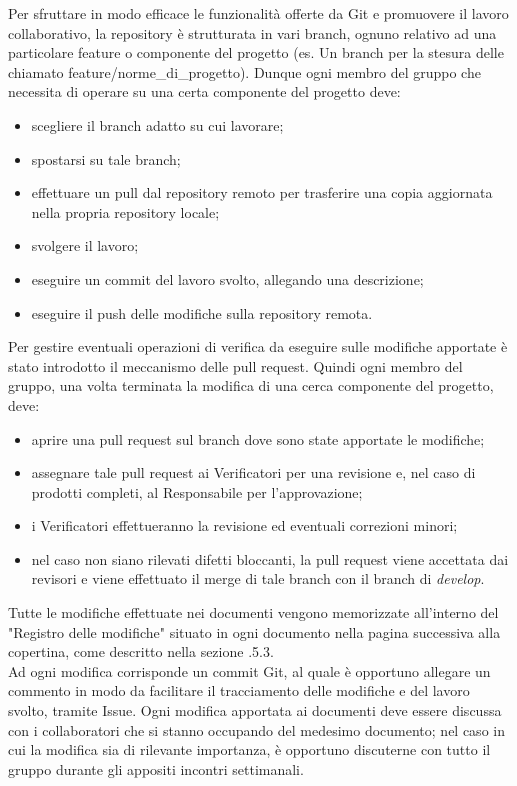         Per sfruttare in modo efficace le funzionalità offerte da Git e promuovere il lavoro collaborativo, la repository è strutturata in vari branch, ognuno relativo ad una particolare feature o componente del progetto (es. Un branch per la stesura delle \NdP{} chiamato feature/norme\_di\_progetto). Dunque ogni membro del gruppo che necessita di operare su una certa componente del progetto deve:
        \begin{itemize}
          \item scegliere il branch adatto su cui lavorare;
          \item spostarsi su tale branch;
          \item effettuare un pull dal repository remoto per trasferire una copia aggiornata nella propria repository locale;
          \item svolgere il lavoro;
          \item eseguire un commit del lavoro svolto, allegando una descrizione;
          \item eseguire il push delle modifiche sulla repository remota.
        \end{itemize}
    	Per gestire eventuali operazioni di verifica da eseguire sulle modifiche apportate è stato introdotto il meccanismo delle pull request. Quindi ogni membro del gruppo, una volta terminata la modifica di una cerca componente del progetto, deve:
    	\begin{itemize}
    		\item aprire una pull request sul branch dove sono state apportate le modifiche;
    		\item assegnare tale pull request ai Verificatori per una revisione e, nel caso di prodotti completi, al Responsabile per l'approvazione;
    		\item i Verificatori effettueranno la revisione ed eventuali correzioni minori;
    		\item nel caso non siano rilevati difetti bloccanti, la pull request viene accettata dai revisori e viene effettuato il merge di tale branch con il branch di \textit{develop}.
    	\end{itemize}

        Tutte le modifiche effettuate nei documenti vengono memorizzate all'interno del "Registro delle modifiche" situato in ogni documento nella pagina successiva alla copertina, come descritto nella sezione .5.3.\\
        Ad ogni modifica corrisponde un commit Git, al quale è opportuno allegare un commento in modo da facilitare il tracciamento delle modifiche e del lavoro svolto, tramite Issue.
        Ogni modifica apportata ai documenti deve essere discussa con i collaboratori che si stanno occupando del medesimo documento; nel caso in cui la modifica sia di rilevante importanza, è opportuno discuterne con tutto il gruppo durante gli appositi incontri settimanali. 
